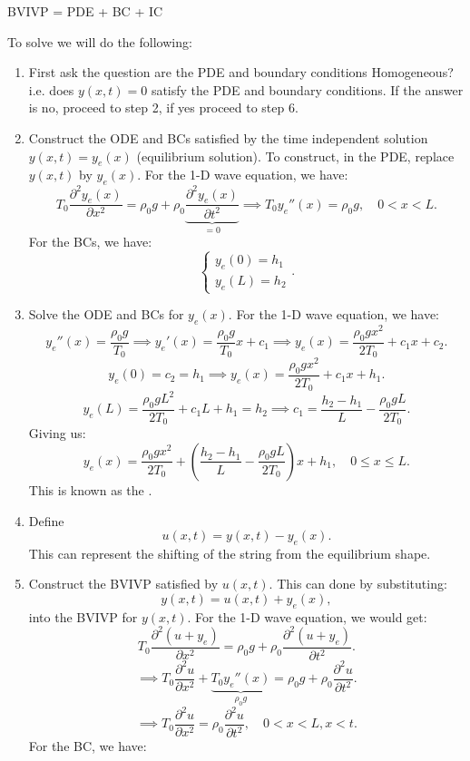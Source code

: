 \documentclass[../main/main.tex]{subfiles}
\begin{document}
\begin{remark}
	BVIVP = PDE + BC + IC
\end{remark}
To solve we will do the following: 
\begin{enumerate}
	\item First ask the question are the PDE and boundary conditions Homogeneous? i.e. does $y(x,t) = 0$ satisfy the PDE and boundary conditions. If the answer is no, proceed to step 2, if yes proceed to step 6.
	\item Construct the ODE and BCs satisfied by the time independent solution $y(x,t) = y_e(x)$ (equilibrium solution). To construct, in the PDE, replace $y(x,t)$ by $y_e(x)$. For the 1-D wave equation, we have: \[
			T_0 \frac{\partial ^2 y_e(x)}{\partial x^2} = \rho_0 g + \rho_0 \underbrace{\frac{\partial ^2 y_e(x)}{\partial t^2} }_{=0} 
	\implies T_0 y_e''(x) = \rho_0 g, \quad 0 < x < L
	.\] For the BCs, we have: \[
	\begin{cases}
		y_e(0) = h_1 \\ 
		y_e(L) = h_2
	\end{cases}
	.\] 
\item Solve the ODE and BCs for $y_e(x)$. For the 1-D wave equation, we have: \[
		y_e''(x) = \frac{\rho_0g}{T_0} \implies y_e'(x) = \frac{\rho_0g}{T_0}x + c_1 \implies y_e(x) = \frac{\rho_0 gx^2}{2T_0} + c_1 x + c_2
.\]  \[
y_e(0) = c_2 = h_1 \implies y_e(x) = \frac{\rho_0g x^2}{2T_0}+c_1 x + h_1
.\] \[
y_e (L) = \frac{\rho_0gL^2}{2T_0}+c_1L + h_1 = h_2 \implies c_1 = \frac{h_2-h_1}{L}- \frac{\rho_0gL}{2T_0}
.\] Giving us: \[
y_e(x) = \frac{\rho_0gx^2}{2T_0}+ \left( \frac{h_2-h_1}{L}-\frac{\rho_0gL}{2T_0} \right) x + h_1 , \quad 0 \le  x \le  L
.\] This is known as the .
\item Define  \[
		u(x,t) = y(x,t) -y_e(x)
	.\] This can represent the shifting of the string from the equilibrium shape.
\item Construct the BVIVP satisfied by $u(x,t)$. This can done by substituting: \[
		y(x,t) = u(x,t) + y_e(x)
		,\] into the BVIVP for $y(x,t)$. For the 1-D wave equation, we would get: \[
		T_0 \frac{\partial^2 (u + y_e)}{\partial x^2} = \rho_0 g + \rho_0 \frac{\partial ^2\left( u+y_e \right) }{\partial t^2}  
.\] \[
\implies T_0 \frac{\partial ^2 u}{\partial x^2} + \underbrace{T_0 y_e''(x)}_{\rho_0 g} = \rho_0 g + \rho_0 \frac{\partial ^2 u}{\partial t^2} 
.\] \[
\implies T_0 \frac{\partial ^2 u}{\partial x^2}  = \rho_0 \frac{\partial ^2 u}{\partial t^2} , \quad 0 < x < L , x < t
.\] For the BC, we have: \[
\]
\end{enumerate}
\end{document}
